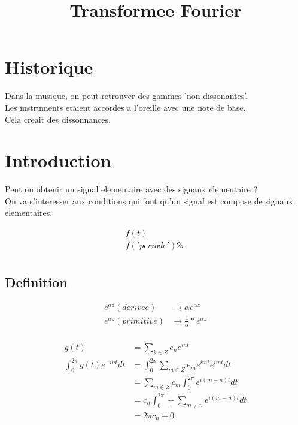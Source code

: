 \documentclass[a4paper,11pt]{article}
\title{Transformee Fourier}
\author{}
\begin{document}
\maketitle
\tableofcontents
\newpage

\section{Historique}

Dans la musique, on peut retrouver des gammes 'non-dissonantes'.\\
Les instruments etaient accordes a l'oreille avec une note de base.\\
Cela creait des dissonnances.\\

\section{Introduction}
Peut on obtenir un signal elementaire avec des signaux elementaire ?\\

On va s'interesser aux conditions qui font qu'un signal est compose de signaux elementaires.

\begin{align*}
f(t)  \\
        f   ('periode')  2\pi \\
\end{align*}

\subsection{Definition}

\begin{align*}
  e^{\alpha z}   (derivee) &\rightarrow \alpha e^{\alpha z}\\
  e^{\alpha z} (primitive) &\rightarrow \frac{1}{\alpha} * e^{\alpha z}\\
\end{align*}

\begin{align*}
  g(t) &= \sum_{k \in Z} e_{n}e^{int}\\
  \int_{0}^{2\pi} g(t)e^{-int} dt &= \int_{0}^{2x} \sum_{m \in Z} e_m e^{imt} e^{imt} dt \\
  &= \sum_{m \in Z} c_m \int_{0}^{2\pi} e^{i(m - n)t} dt\\
  &= c_n \int_{0}^{2\pi} + \sum_{m \neq n} e^{i(m-n)t} dt \\
  &= 2\pi c_n + 0
\end{align*}
\end{document}
